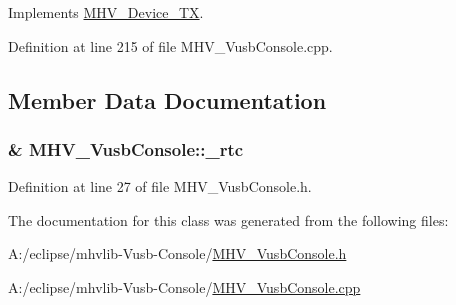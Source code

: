 \-Implements \hyperlink{class_m_h_v___device___t_x_a3a86067d417c3d5a1f64042ecfcefff7}{\-M\-H\-V\-\_\-\-Device\-\_\-\-T\-X}.



\-Definition at line 215 of file \-M\-H\-V\-\_\-\-Vusb\-Console.\-cpp.



\subsection{\-Member \-Data \-Documentation}
\hypertarget{class_m_h_v___vusb_console_a0ccd1ee48d53ee1871f8d1d1ba068825}{
\subsubsection[{\-\_\-rtc}]{\& {\bf \-M\-H\-V\-\_\-\-Vusb\-Console\-::\-\_\-rtc}}}
\label{class_m_h_v___vusb_console_a0ccd1ee48d53ee1871f8d1d1ba068825}


\-Definition at line 27 of file \-M\-H\-V\-\_\-\-Vusb\-Console.\-h.



\-The documentation for this class was generated from the following files\-:\begin{DoxyCompactItemize}
\item 
\-A\-:/eclipse/mhvlib-\/\-Vusb-\/\-Console/\hyperlink{_m_h_v___vusb_console_8h}{\-M\-H\-V\-\_\-\-Vusb\-Console.\-h}\item 
\-A\-:/eclipse/mhvlib-\/\-Vusb-\/\-Console/\hyperlink{_m_h_v___vusb_console_8cpp}{\-M\-H\-V\-\_\-\-Vusb\-Console.\-cpp}\end{DoxyCompactItemize}
